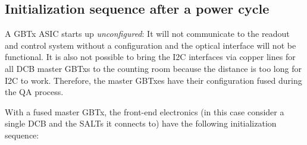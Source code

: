 \subsection{Initialization sequence after a power cycle}
\label{dcb-init}

A GBTx ASIC starts up \emph{unconfigured}:
It will not communicate to the readout and control system without a
configuration and the optical interface will not be functional.
It is also not possible to bring the I2C interfaces via copper lines for all
DCB master GBTxs to the counting room because the distance is too long for I2C
to work.
Therefore, the master GBTxes have their configuration fused during the QA
process.

With a fused master GBTx, the front-end electronics
(in this case consider a single DCB and the SALTs it connects to) have the
following initialization sequence:

